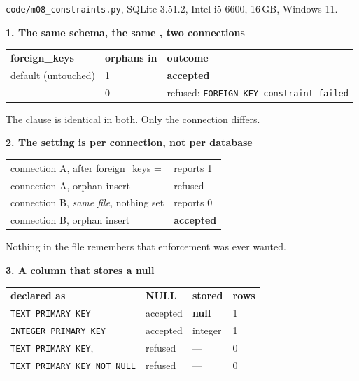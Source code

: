 \begin{measured}
\textsf{\footnotesize \texttt{code/m08\_constraints.py}, SQLite 3.51.2,
Intel i5-6600, 16\,GB, Windows 11.}

\medskip
\textbf{1. The same schema, the same , two connections}

\begin{tabular}{@{}L{5.6cm}R{2.4cm}L{5.6cm}@{}}
\textbf{ foreign\_keys} & \textbf{orphans in} & \textbf{outcome} \\
default (untouched) & 1 & \textbf{accepted} \\
          & 0 & refused: \texttt{FOREIGN KEY constraint failed} \\
\end{tabular}

\smallskip
The  clause is identical in both. Only the connection
differs.

\medskip
\textbf{2. The setting is per connection, not per database}

\begin{tabular}{@{}L{8.6cm}L{5.0cm}@{}}
connection A, after  foreign\_keys =  & reports 1 \\
connection A, orphan insert & refused \\
connection B, \emph{same file}, nothing set & reports 0 \\
connection B, orphan insert & \textbf{accepted} \\
\end{tabular}

\smallskip
Nothing in the file remembers that enforcement was ever wanted.

\medskip
\textbf{3. A  column that stores a null}

\begin{tabular}{@{}L{5.6cm}R{2.6cm}R{2.4cm}R{2.0cm}@{}}
\textbf{declared as} & \textbf{ NULL} & \textbf{stored} & \textbf{rows} \\
\texttt{TEXT PRIMARY KEY}            & accepted & \textbf{null} & 1 \\
\texttt{INTEGER PRIMARY KEY}         & accepted & integer & 1 \\
\texttt{TEXT PRIMARY KEY},  & refused & --- & 0 \\
\texttt{TEXT PRIMARY KEY NOT NULL}   & refused & --- & 0 \\
\end{tabular}


\end{measured}
